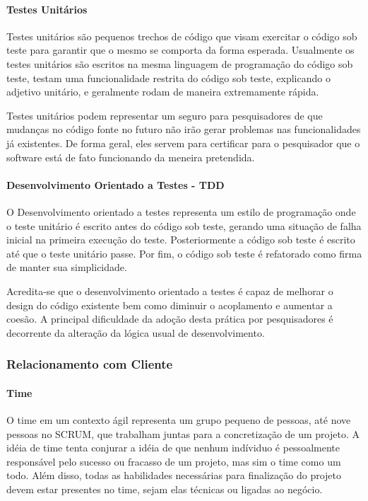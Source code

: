 \documentclass[
	article,			%
	11pt,				%
	oneside,			%
	a4paper,			%
	english,			%
	brazil,				%
	sumario=tradicional
	]{abntex2}
\begin{document}
\paragraph*{Testes Unitários}
Testes unitários são pequenos trechos de código que visam exercitar o código sob teste para garantir que o mesmo se comporta da forma esperada. Usualmente os testes unitários são escritos na mesma linguagem de programação do código sob teste, testam uma funcionalidade restrita do código sob teste, explicando o adjetivo unitário, e geralmente rodam de maneira extremamente rápida.

Testes unitários podem representar um seguro para pesquisadores de que mudanças no código fonte no futuro não irão gerar problemas nas funcionalidades já existentes. De forma geral, eles servem para certificar para o pesquisador que o software está de fato funcionando da meneira pretendida.

\paragraph*{Desenvolvimento Orientado a Testes - TDD}
O Desenvolvimento orientado a testes representa um estilo de programação onde o teste unitário é escrito antes do código sob teste, gerando uma situação de falha inicial na primeira execução do teste. Posteriormente a código sob teste é escrito até que o teste unitário passe. Por fim, o código sob teste é refatorado como firma de manter sua simplicidade.

Acredita-se que o desenvolvimento orientado a testes é capaz de melhorar o design do código existente bem como diminuir o acoplamento e aumentar a coesão. A principal dificuldade da adoção desta prática por pesquisadores é decorrente da alteração da lógica usual de desenvolvimento. 

\subsubsection*{Relacionamento com Cliente}

\paragraph*{Time}
O time em um contexto ágil representa um grupo pequeno de pessoas, até nove pessoas no SCRUM, que trabalham juntas para a concretização de um projeto. A idéia de time tenta conjurar a idéia de que nenhum indíviduo é pessoalmente responsável pelo sucesso ou fracasso de um projeto, mas sim o time como um todo. Além disso, todas as habilidades necessárias para finalização do projeto devem estar presentes no time, sejam elas técnicas ou ligadas ao negócio.
\end{document}
